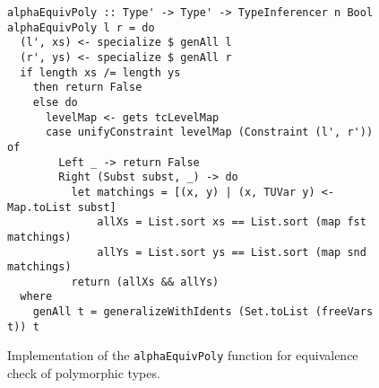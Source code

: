 \begin{figure}[H]
  \begin{verbatim}
alphaEquivPoly :: Type' -> Type' -> TypeInferencer n Bool
alphaEquivPoly l r = do
  (l', xs) <- specialize $ genAll l
  (r', ys) <- specialize $ genAll r
  if length xs /= length ys
    then return False
    else do
      levelMap <- gets tcLevelMap
      case unifyConstraint levelMap (Constraint (l', r')) of
        Left _ -> return False
        Right (Subst subst, _) -> do
          let matchings = [(x, y) | (x, TUVar y) <- Map.toList subst]
              allXs = List.sort xs == List.sort (map fst matchings)
              allYs = List.sort ys == List.sort (map snd matchings)
          return (allXs && allYs)
  where
    genAll t = generalizeWithIdents (Set.toList (freeVars t)) t
  \end{verbatim}
  \caption{Implementation of the \texttt{alphaEquivPoly} function for equivalence check of polymorphic types.}
  \label{fig:alpha-equiv-poly-impl}
\end{figure}
